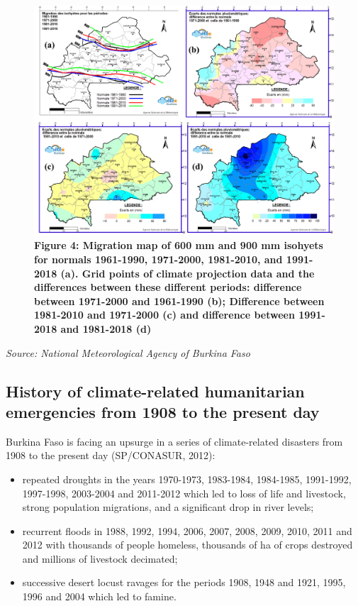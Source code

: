 \documentclass[
]{book}
\begin{document}
\begin{figure}
\centering
\includegraphics{Figures and Photos/Figure 4.png}
\caption{\textbf{Figure 4: Migration map of 600 mm and 900 mm isohyets for normals 1961-1990, 1971-2000, 1981-2010, and 1991-2018 (a). Grid points of climate projection data and the differences between these different periods: difference between 1971-2000 and 1961-1990 (b); Difference between 1981-2010 and 1971-2000 (c) and difference between 1991-2018 and 1981-2018 (d)}}
\end{figure}

\emph{Source: National Meteorological Agency of Burkina Faso}

\subsection{History of climate-related humanitarian emergencies from 1908 to the present day}\label{history-of-climate-related-humanitarian-emergencies-from-1908-to-the-present-day}

Burkina Faso is facing an upsurge in a series of climate-related disasters from 1908 to the present day (SP/CONASUR, 2012):

\begin{itemize}
\item
  repeated droughts in the years 1970-1973, 1983-1984, 1984-1985, 1991-1992, 1997-1998, 2003-2004 and 2011-2012 which led to loss of life and livestock, strong population migrations, and a significant drop in river levels;
\item
  recurrent floods in 1988, 1992, 1994, 2006, 2007, 2008, 2009, 2010, 2011 and 2012 with thousands of people homeless, thousands of ha of crops destroyed and millions of livestock decimated;
\item
  successive desert locust ravages for the periods 1908, 1948 and 1921, 1995, 1996 and 2004 which led to famine.
\end{itemize}
\end{document}

